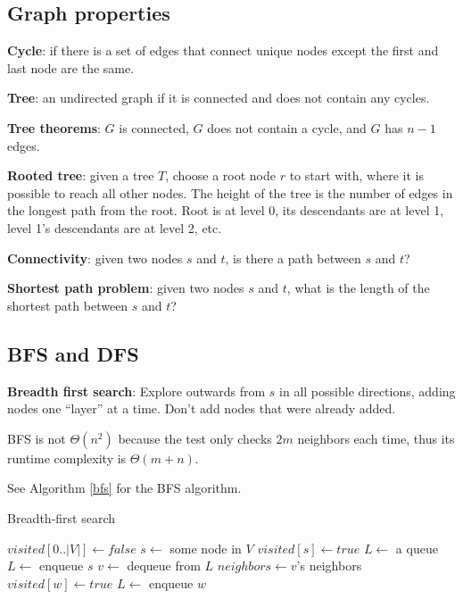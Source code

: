 \documentclass{article}
\begin{document}
\subsection{Graph properties}

\textbf{Cycle}: if there is a set of edges that connect unique nodes except the first and last node are the same.

\textbf{Tree}: an undirected graph if it is connected and does not contain any cycles.

\textbf{Tree theorems}: $G$ is connected, $G$ does not contain a cycle, and $G$ has $n - 1$ edges.

\textbf{Rooted tree}: given a tree $T$, choose a root node $r$ to start with, where it is possible to reach all other nodes. The height of the tree is the number of edges in the longest path from the root. Root is at level 0, its descendants are at level 1, level 1's descendants are at level 2, etc.

\textbf{Connectivity}: given two nodes $s$ and $t$, is there a path between $s$ and $t$?

\textbf{Shortest path problem}: given two nodes $s$ and $t$, what is the length of the shortest path between $s$ and $t$?

\subsection{BFS and DFS}

\textbf{Breadth first search}: Explore outwards from $s$ in all possible directions, adding nodes one ``layer'' at a time. Don't add nodes that were already added.

BFS is not $\Theta(n^2)$ because the test only checks $2m$ neighbors each time, thus its runtime complexity is $\Theta(m + n)$.

See Algorithm \ref{bfs} for the BFS algorithm.

\begin{algorithm}
\caption{Breadth-first search}\label{bfs}
\begin{algorithmic}[1]
    \State $visited[0..|V|] \gets false$ 
    \State $s \gets$ some node in $V$ 
    \State $visited[s] \gets true$
    \State $L \gets$ a queue 
    \State $L \gets$ enqueue $s$
        \State $v \gets$ dequeue from $L$
        \State $neighbors \gets v$'s neighbors
                \State $visited[w] \gets true$
                \State $L \gets$ enqueue $w$
            \EndIf
        \EndFor
    \EndWhile
\EndProcedure
\end{algorithmic}
\end{algorithm}
\end{document}
